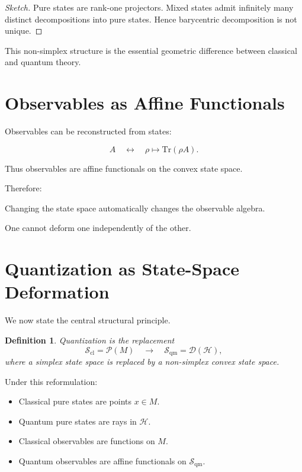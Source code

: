 \documentclass[11pt]{article}
\newtheorem{definition}{Definition}
\begin{document}
\begin{proof}[Sketch]
Pure states are rank-one projectors.
Mixed states admit infinitely many distinct decompositions into pure states.
Hence barycentric decomposition is not unique.
\end{proof}

This non-simplex structure is the essential geometric difference
between classical and quantum theory.

\section{Observables as Affine Functionals}

Observables can be reconstructed from states:

\begin{equation}
A \quad \longleftrightarrow \quad
\rho \mapsto \mathrm{Tr}(\rho A).
\end{equation}

Thus observables are affine functionals on the convex state space.

Therefore:

\begin{center}
Changing the state space automatically changes the observable algebra.
\end{center}

One cannot deform one independently of the other.

\section{Quantization as State-Space Deformation}

We now state the central structural principle.

\begin{definition}
Quantization is the replacement
\[
\mathcal{S}_{\mathrm{cl}} = \mathcal{P}(M)
\quad \longrightarrow \quad
\mathcal{S}_{\mathrm{qm}} = \mathcal{D}(\mathcal{H}),
\]
where a simplex state space is replaced by a non-simplex convex state space.
\end{definition}

Under this reformulation:

\begin{itemize}[leftmargin=1.5em]
\item Classical pure states are points $x \in M$.
\item Quantum pure states are rays in $\mathcal{H}$.
\item Classical observables are functions on $M$.
\item Quantum observables are affine functionals on $\mathcal{S}_{\mathrm{qm}}$.
\end{itemize}
\end{document}
